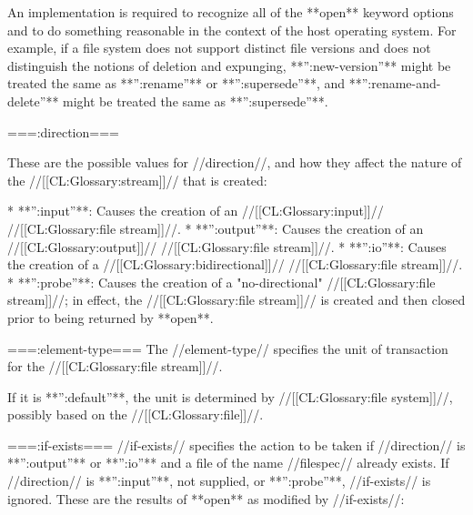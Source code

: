An implementation is required to recognize all of the **open** keyword options and to do something reasonable in the context of the host operating system. For example, if a file system does not support distinct file versions and does not distinguish the notions of deletion and expunging, **'':new-version''** might be treated the same as **'':rename''** or **'':supersede''**, and **'':rename-and-delete''** might be treated the same as **'':supersede''**.

===:direction===

These are the possible values for //direction//, and how they affect the nature of the //[[CL:Glossary:stream]]// that is created:

  * **'':input''**: Causes the creation of an //[[CL:Glossary:input]]// //[[CL:Glossary:file stream]]//.
  * **'':output''**: Causes the creation of an //[[CL:Glossary:output]]// //[[CL:Glossary:file stream]]//.
  * **'':io''**: Causes the creation of a //[[CL:Glossary:bidirectional]]// //[[CL:Glossary:file stream]]//.
  * **'':probe''**: Causes the creation of a "no-directional" //[[CL:Glossary:file stream]]//; in effect, the //[[CL:Glossary:file stream]]// is created and then closed prior to being returned by **open**.

===:element-type===
The //element-type// specifies the unit of transaction for the //[[CL:Glossary:file stream]]//.

If it is **'':default''**, the unit is determined by //[[CL:Glossary:file system]]//, possibly based on the //[[CL:Glossary:file]]//.

===:if-exists===
//if-exists// specifies the action to be taken if //direction// is **'':output''** or **'':io''** and a file of the name //filespec// already exists. If //direction// is **'':input''**, not supplied, or **'':probe''**, //if-exists// is ignored. These are the results of **open** as modified by //if-exists//:


